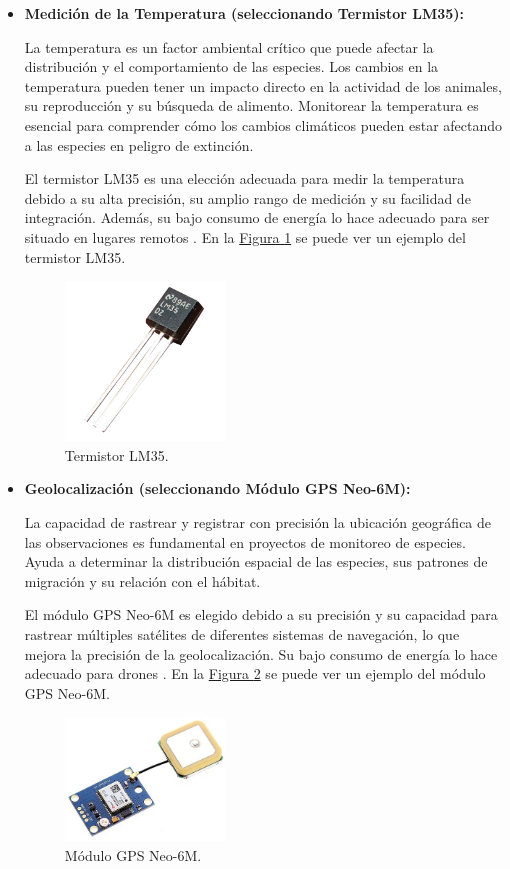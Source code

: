  \begin{itemize}
     \item \textbf{Medición de la Temperatura (seleccionando Termistor LM35):}

La temperatura es un factor ambiental crítico que puede afectar la distribución y el comportamiento de las especies. Los cambios en la temperatura pueden tener un impacto directo en la actividad de los animales, su reproducción y su búsqueda de alimento. Monitorear la temperatura es esencial para comprender cómo los cambios climáticos pueden estar afectando a las especies en peligro de extinción.

El termistor LM35 es una elección adecuada para medir la temperatura debido a su alta precisión, su amplio rango de medición y su facilidad de integración. Además, su bajo consumo de energía lo hace adecuado para ser situado en lugares remotos \cite{86}. En la \hyperref[termistor]{Figura \ref{termistor}} se puede ver un ejemplo del termistor LM35.
\begin{figure}[H]
  \centering
  \includegraphics[width=0.4\textwidth]{imagenes/termistor.png}
  \caption{Termistor LM35.}
  \label{termistor}
\end{figure}

\item \textbf{Geolocalización (seleccionando Módulo GPS Neo-6M):}

La capacidad de rastrear y registrar con precisión la ubicación geográfica de las observaciones es fundamental en proyectos de monitoreo de especies. Ayuda a determinar la distribución espacial de las especies, sus patrones de migración y su relación con el hábitat.

El módulo GPS Neo-6M es elegido debido a su precisión y su capacidad para rastrear múltiples satélites de diferentes sistemas de navegación, lo que mejora la precisión de la geolocalización. Su bajo consumo de energía lo hace adecuado para drones \cite{94}. En la \hyperref[gps]{Figura \ref{gps}} se puede ver un ejemplo del módulo GPS Neo-6M.
\begin{figure}[H]
  \centering
  \includegraphics[width=0.4\textwidth]{imagenes/gps.jpg}
  \caption{Módulo GPS Neo-6M.}
  \label{gps}
\end{figure}


\end{itemize}
